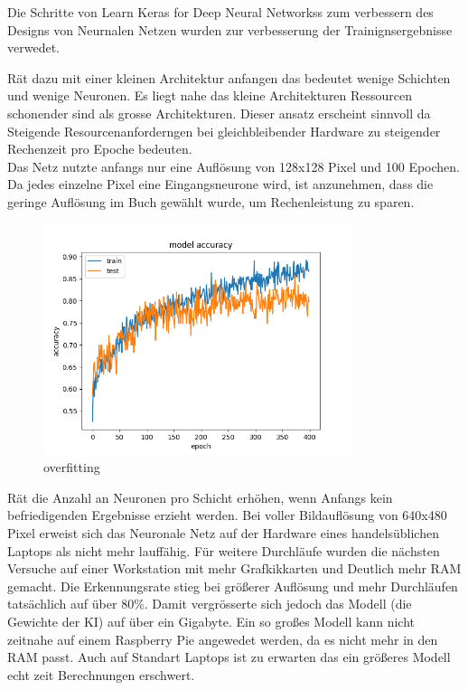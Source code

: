 \documentclass[conference]{IEEEtran}
\begin{document}
Die Schritte von  \glqq Learn Keras for Deep Neural Networkss\grqq  \cite{b3} zum verbessern des Designs von Neurnalen Netzen wurden zur verbesserung der Trainignsergebnisse verwedet. 

\cite{b3}  Rät dazu mit einer kleinen Architektur anfangen das bedeutet wenige Schichten und wenige Neuronen. Es liegt nahe das kleine Architekturen Ressourcen schonender sind als grosse Architekturen. Dieser ansatz erscheint sinnvoll da Steigende Resourcenanforderngen bei gleichbleibender Hardware zu steigender Rechenzeit pro Epoche bedeuten. \\

Das Netz nutzte anfangs nur eine Auflösung von 128x128 Pixel und 100 Epochen. Da jedes einzelne Pixel eine Eingangsneurone wird, ist anzunehmen, dass die geringe Auflösung im Buch gewählt wurde, um Rechenleistung zu sparen. \\

\begin{figure}[!h]
	\centering
	\includegraphics[width=9cm]{img/213x160:400@32_accuracy.png}
	\caption{overfitting}
	\label{Overfitt }
\end{figure}

\cite{b3} Rät die Anzahl an Neuronen pro Schicht erhöhen, wenn Anfangs kein befriedigenden Ergebnisse erzieht werden.
Bei voller Bildauflösung von 640x480 Pixel erweist sich das Neuronale Netz auf der Hardware eines handelsüblichen Laptops als nicht mehr lauffähig. Für weitere Durchläufe wurden die nächsten Versuche auf einer Workstation mit mehr Grafkikkarten und Deutlich mehr RAM gemacht. Die Erkennungsrate stieg bei größerer Auflösung und mehr Durchläufen tatsächlich auf über 80\%. Damit vergrösserte sich jedoch das Modell (die Gewichte der KI) auf über ein Gigabyte. Ein so großes Modell kann nicht zeitnahe auf einem Raspberry Pie angewedet werden, da es nicht mehr in den RAM passt. Auch auf Standart Laptops ist zu erwarten das ein größeres Modell echt zeit Berechnungen erschwert. \\
\end{document}
